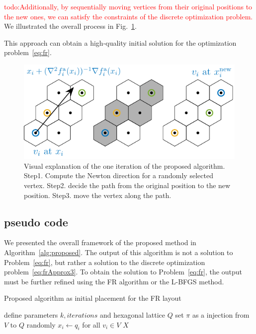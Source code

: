 \documentclass[dvipdfmx,journal]{IEEEtran}
\newcommand{\red}[1]{\textcolor{red}{#1}}
\begin{document}
\red{todo:Additionally, by sequentially moving vertices from their original positions to the new ones, we can satisfy the constraints of the discrete optimization problem.}
We illustrated the overall process in Fig.~\ref{fig:hex}.

This approach can obtain a high-quality initial solution for the optimization problem~\eqref{eq:fr}.

\begin{figure}[t]
  \centering
  \includegraphics[width=\columnwidth]{hex/hex.pdf}
  \caption{Visual explanation of the one iteration of the proposed algorithm. Step1. Compute the Newton direction for a randomly selected vertex. Step2. decide the path from the original position to the new position. Step3. move the vertex along the path.}
  \label{fig:hex}
\end{figure}

\subsection{pseudo code}\label{ssec:pseudoCode}

We presented the overall framework of the proposed method in Algorithm~\ref{alg:proposed}.
The output of this algorithm is not a solution to Problem~\eqref{eq:fr}, but rather a solution to the discrete optimization problem~\eqref{eq:frApprox3}.
To obtain the solution to Problem~\eqref{eq:fr}, the output must be further refined using the FR algorithm or the L-BFGS method.

\begin{algorithm}[ht]
  \caption{Proposed algorithm as initial placement for the FR layout}
  \label{alg:proposed}

  define parameters $k, \textit{iterations}$ and hexagonal lattice $Q$\;
  set $\pi$ as a injection from $V$ to $Q$ randomly\;
  $x_i \gets q_i$ for all $v_i \in V$\;
  \Return $X$
\end{algorithm}
\end{document}
